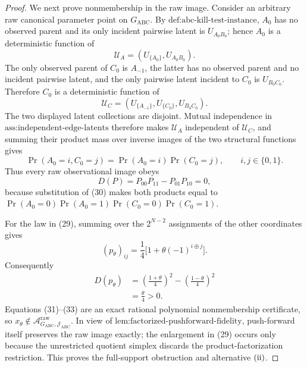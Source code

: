 \documentclass{article}
\begin{document}
\begin{proof}
We next prove nonmembership in the raw image.  Consider an arbitrary raw canonical parameter point on \(G_{\mathrm{ABC}}\).  By \(\text{def:abc-kill-test-instance}\), \(A_0\) has no observed parent and its only incident pairwise latent is \(U_{A_0B_0}\); hence \(A_0\) is a deterministic function of
\[
\mathcal U_A=(U_{\{A_0\}},U_{A_0B_0}).
\]
The only observed parent of \(C_0\) is \(A_{-1}\), the latter has no observed parent and no incident pairwise latent, and the only pairwise latent incident to \(C_0\) is \(U_{B_0C_0}\).  Therefore \(C_0\) is a deterministic function of
\[
\mathcal U_C=(U_{\{A_{-1}\}},U_{\{C_0\}},U_{B_0C_0}).
\]
The two displayed latent collections are disjoint.  Mutual independence in \(\text{ass:independent-edge-latents}\) therefore makes \(\mathcal U_A\) independent of \(\mathcal U_C\), and summing their product mass over inverse images of the two structural functions gives
\[
\Pr(A_0=i,C_0=j)=\Pr(A_0=i)\Pr(C_0=j),
\qquad i,j\in\{0,1\}.
\tag{30}
\]
Thus every raw observational image obeys
\[
D(P)=P_{00}P_{11}-P_{01}P_{10}=0,
\tag{31}
\]
because substitution of (30) makes both products equal to
\(\Pr(A_0=0)\Pr(A_0=1)\Pr(C_0=0)\Pr(C_0=1)\).

For the law in (29), summing over the \(2^{N-2}\) assignments of the other coordinates gives
\[
(p_\theta)_{ij}
=\frac14\bigl[1+\theta(-1)^{i\oplus j}\bigr].
\tag{32}
\]
Consequently
\[
\begin{aligned}
D(p_\theta)
&=\left(\frac{1+\theta}{4}\right)^2
-\left(\frac{1-\theta}{4}\right)^2\\
&=\frac{\theta}{4}>0.
\end{aligned}
\tag{33}
\]
Equations (31)--(33) are an exact rational polynomial nonmembership certificate, so \(x_\theta\notin\mathcal A_{G_{\mathrm{ABC}},\mathcal J_{\mathrm{ABC}}}^{\mathrm{raw}}\).  In view of \(\text{lem:factorized-pushforward-fidelity}\), push-forward itself preserves the raw image exactly; the enlargement in (29) occurs only because the unrestricted quotient simplex discards the product-factorization restriction.  This proves the full-support obstruction and alternative \({\rm(ii)}\).


\end{proof}
\end{document}
